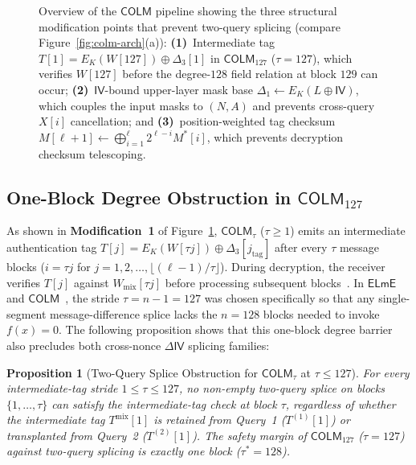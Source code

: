 \documentclass[11pt,a4paper]{article}
\newtheorem{proposition}{Proposition}
\theoremstyle{definition}
\theoremstyle{remark}
\newcommand{\COLM}{\mathsf{COLM}}
\newcommand{\COLMott}{\mathsf{COLM}_{127}}
\newcommand{\ELmE}{\mathsf{ELmE}}
\newcommand{\IV}{\mathsf{IV}}
\begin{document}
\begin{figure}[t!]
\begin{tikzpicture}
\end{tikzpicture}
\caption{Overview of the $\COLM$ pipeline showing the three structural modification points that prevent two-query splicing (compare Figure~\ref{fig:colm-arch}(a)): \textbf{(1)}~Intermediate tag $T[1] = E_K(W[127]) \oplus \Delta_3[1]$ in $\COLMott$ ($\tau = 127$), which verifies $W[127]$ before the degree-$128$ field relation at block $129$ can occur; \textbf{(2)}~$\IV$-bound upper-layer mask base $\Delta_1 \leftarrow E_K(L \oplus \IV)$, which couples the input masks to $(N, A)$ and prevents cross-query $X[i]$ cancellation; and \textbf{(3)}~position-weighted tag checksum $M[\ell+1] \leftarrow \bigoplus_{i=1}^\ell 2^{\ell-i} M^*[i]$, which prevents decryption checksum telescoping.}
\label{fig:colm-mitigations}
\end{figure}

\subsection{One-Block Degree Obstruction in \texorpdfstring{$\COLMott$}{COLM\_127}}
As shown in \textbf{Modification~1} of Figure~\ref{fig:colm-mitigations}, $\COLM_\tau$ ($\tau \ge 1$) emits an intermediate authentication tag $T[j] = E_K(W[\tau j]) \oplus \Delta_3[j_{\mathrm{tag}}]$ after every $\tau$ message blocks ($i = \tau j$ for $j = 1, 2, \dots, \lfloor (\ell-1)/\tau \rfloor$). During decryption, the receiver verifies $T[j]$ against $W_{\mathrm{mix}}[\tau j]$ before processing subsequent blocks~\cite[Sections~1.4 and~1.5.4, pp.~6, 8]{COLMv1}. In $\ELmE$~\cite[Lemma~9 and Section~5.2]{DN14} and $\COLM$~\cite[Remark~1, p.~155]{DLMN17}, the stride $\tau = n - 1 = 127$ was chosen specifically so that any single-segment message-difference splice lacks the $n = 128$ blocks needed to invoke $f(x) = 0$. The following proposition shows that this one-block degree barrier also precludes both cross-nonce $\Delta\IV$ splicing families:

\begin{proposition}[Two-Query Splice Obstruction for $\COLM_\tau$ at $\tau \le 127$]
\label{prop:colm127}
For every intermediate-tag stride $1 \le \tau \le 127$, no non-empty two-query splice on blocks $\{1, \dots, \tau\}$ can satisfy the intermediate-tag check at block $\tau$, regardless of whether the intermediate tag $T^{\mathrm{mix}}[1]$ is retained from Query~1 ($T^{(1)}[1]$) or transplanted from Query~2 ($T^{(2)}[1]$). The safety margin of $\COLMott$ ($\tau = 127$) against two-query splicing is \emph{exactly one block} ($\tau^* = 128$).
\end{proposition}
\end{document}
